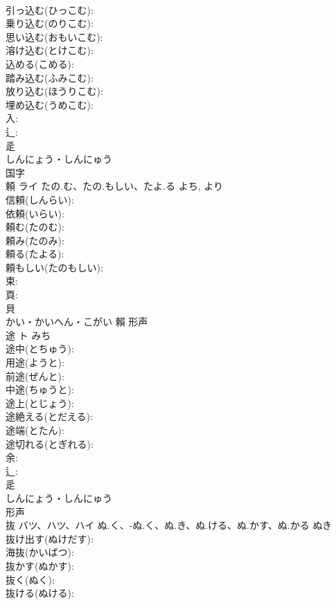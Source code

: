\documentclass[8pt]{extreport}
\begin{document}
\begin{CJK}{UTF8}{min}
\\	引っ込む(ひっこむ): 
\\	乗り込む(のりこむ): 
\\	思い込む(おもいこむ): 
\\	溶け込む(とけこむ): 
\\	込める(こめる): 
\\	踏み込む(ふみこむ): 
\\	放り込む(ほうりこむ): 
\\	埋め込む(うめこむ): 
\\	入: 
\\	辶: 
\\	辵	
\\	しんにょう・しんにゅう	
\\	国字 
\\	頼	ライ	たの.む、たの.もしい、たよ.る	よち, より	
\\	信頼(しんらい): 
\\	依頼(いらい): 
\\	頼む(たのむ): 
\\	頼み(たのみ): 
\\	頼る(たよる): 
\\	頼もしい(たのもしい): 
\\	束: 
\\	頁: 
\\	貝	
\\	かい・かいへん・こがい	賴	形声 
\\	途	ト	みち		
\\	途中(とちゅう): 
\\	用途(ようと): 
\\	前途(ぜんと): 
\\	中途(ちゅうと): 
\\	途上(とじょう): 
\\	途絶える(とだえる): 
\\	途端(とたん): 
\\	途切れる(とぎれる): 
\\	余: 
\\	辶: 
\\	辵	
\\	しんにょう・しんにゅう	
\\	形声 
\\	抜	バツ、ハツ、ハイ	ぬ.く、-ぬ.く、ぬ.き、ぬ.ける、ぬ.かす、ぬ.かる	ぬき	
\\	抜け出す(ぬけだす): 
\\	海抜(かいばつ): 
\\	抜かす(ぬかす): 
\\	抜く(ぬく): 
\\	抜ける(ぬける): 

\end{CJK}
\end{document}
